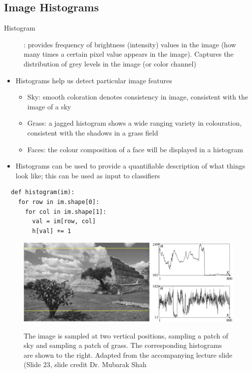 \documentclass[letterpaper,12pt]{article}
\begin{document}
\subsection{Image Histograms}
\begin{description}
 \item[Histogram]: provides frequency of brightness (intensity) values in the image (how many times a certain pixel value appears in the image). Captures the distribution of grey levels in the image (or color channel)
\end{description}
\begin{itemize}
 \item Histograms help us detect particular image features
       \begin{itemize}
        \item Sky: smooth coloration denotes consistency in image, consistent with the image of a sky
        \item Grass: a jagged histogram shows a wide ranging variety in colouration, consistent with the shadows in a grass field
        \item Faces: the colour composition of a face will be displayed in a histogram
       \end{itemize}
 \item Histograms can be used to provide a quantifiable description of what things look like; this can be used as input to classifiers
\end{itemize}

\begin{lstlisting}
  def histogram(im):
    for row in im.shape[0]:
      for col in im.shape[1]:
        val = im[row, col]
        h[val] += 1
\end{lstlisting}

\begin{figure}[h!]
 \begin{center}
  \includegraphics[scale=0.4]{images/histogram.png} \\
  \caption{The image is sampled at two vertical positions, sampling a patch of sky and sampling a patch of grass. The corresponding histograms are shown to the right. Adapted from the accompanying lecture slide (Slide 23, slide credit Dr. Mubarak Shah}
 \end{center}
\end{figure}
\end{document}

